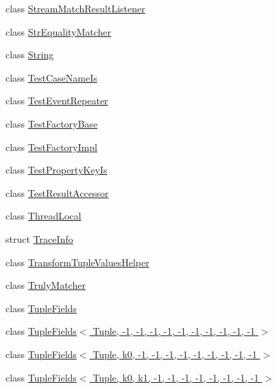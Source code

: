 \begin{DoxyCompactItemize}
\item 
class \hyperlink{classtesting_1_1internal_1_1StreamMatchResultListener}{Stream\+Match\+Result\+Listener}
\item 
class \hyperlink{classtesting_1_1internal_1_1StrEqualityMatcher}{Str\+Equality\+Matcher}
\item 
class \hyperlink{classtesting_1_1internal_1_1String}{String}
\item 
class \hyperlink{classtesting_1_1internal_1_1TestCaseNameIs}{Test\+Case\+Name\+Is}
\item 
class \hyperlink{classtesting_1_1internal_1_1TestEventRepeater}{Test\+Event\+Repeater}
\item 
class \hyperlink{classtesting_1_1internal_1_1TestFactoryBase}{Test\+Factory\+Base}
\item 
class \hyperlink{classtesting_1_1internal_1_1TestFactoryImpl}{Test\+Factory\+Impl}
\item 
class \hyperlink{classtesting_1_1internal_1_1TestPropertyKeyIs}{Test\+Property\+Key\+Is}
\item 
class \hyperlink{classtesting_1_1internal_1_1TestResultAccessor}{Test\+Result\+Accessor}
\item 
class \hyperlink{classtesting_1_1internal_1_1ThreadLocal}{Thread\+Local}
\item 
struct \hyperlink{structtesting_1_1internal_1_1TraceInfo}{Trace\+Info}
\item 
class \hyperlink{classtesting_1_1internal_1_1TransformTupleValuesHelper}{Transform\+Tuple\+Values\+Helper}
\item 
class \hyperlink{classtesting_1_1internal_1_1TrulyMatcher}{Truly\+Matcher}
\item 
class \hyperlink{classtesting_1_1internal_1_1TupleFields}{Tuple\+Fields}
\item 
class \hyperlink{classtesting_1_1internal_1_1TupleFields_3_01Tuple_00_01-1_00_01-1_00_01-1_00_01-1_00_01-1_00_01-e023d39d312048e71832a898e9e07f70}{Tuple\+Fields$<$ Tuple, -\/1, -\/1, -\/1, -\/1, -\/1, -\/1, -\/1, -\/1, -\/1, -\/1 $>$}
\item 
class \hyperlink{classtesting_1_1internal_1_1TupleFields_3_01Tuple_00_01k0_00_01-1_00_01-1_00_01-1_00_01-1_00_01-d80da5b2d6dff94ddefe7f2fc2de778d}{Tuple\+Fields$<$ Tuple, k0, -\/1, -\/1, -\/1, -\/1, -\/1, -\/1, -\/1, -\/1, -\/1 $>$}
\item 
class \hyperlink{classtesting_1_1internal_1_1TupleFields_3_01Tuple_00_01k0_00_01k1_00_01-1_00_01-1_00_01-1_00_01-fb5812c507091ce72ac353453b83394d}{Tuple\+Fields$<$ Tuple, k0, k1, -\/1, -\/1, -\/1, -\/1, -\/1, -\/1, -\/1, -\/1 $>$}

\end{DoxyCompactItemize}
